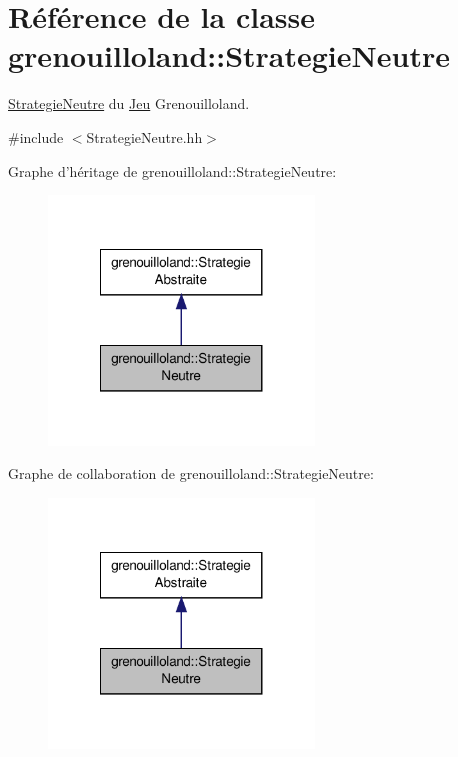 \hypertarget{classgrenouilloland_1_1StrategieNeutre}{\section{Référence de la classe grenouilloland\-:\-:Strategie\-Neutre}
\label{classgrenouilloland_1_1StrategieNeutre}
}


\hyperlink{classgrenouilloland_1_1StrategieNeutre}{Strategie\-Neutre} du \hyperlink{classgrenouilloland_1_1Jeu}{Jeu} Grenouilloland.  




{\ttfamily \#include $<$Strategie\-Neutre.\-hh$>$}



Graphe d'héritage de grenouilloland\-:\-:Strategie\-Neutre\-:
\nopagebreak
\begin{figure}[H]
\begin{center}
\leavevmode
\includegraphics[width=200pt]{classgrenouilloland_1_1StrategieNeutre__inherit__graph}
\end{center}
\end{figure}


Graphe de collaboration de grenouilloland\-:\-:Strategie\-Neutre\-:
\nopagebreak
\begin{figure}[H]
\begin{center}
\leavevmode
\includegraphics[width=200pt]{classgrenouilloland_1_1StrategieNeutre__coll__graph}
\end{center}
\end{figure}
